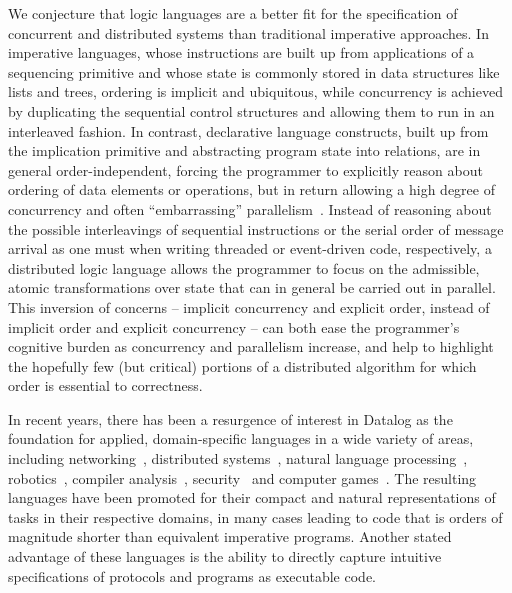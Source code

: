 We conjecture that logic languages are a better fit for the specification of concurrent and distributed systems than traditional imperative approaches.  In imperative languages, whose instructions are built up from applications of a sequencing primitive and whose state is commonly stored in data structures like lists and trees, ordering is implicit and ubiquitous, 
while concurrency is achieved by duplicating the sequential control structures and allowing them
to run in an interleaved fashion.
In contrast, declarative language constructs, built up from the implication primitive and abstracting program state into relations, are in general order-independent, forcing the programmer to explicitly reason about ordering of data elements or operations, but in return allowing a high degree of concurrency and often ``embarrassing'' 
parallelism~\cite{podskey}.  Instead of reasoning about the possible interleavings of sequential
instructions or the serial order of message arrival as one must when writing threaded or 
event-driven code, respectively, a distributed logic language allows the programmer to focus
on the admissible, atomic transformations over state that can in general be carried out in
parallel.  This inversion of concerns -- implicit concurrency and explicit order, instead of
implicit order and explicit concurrency -- can both ease the programmer's cognitive burden as
concurrency and parallelism increase, and help to highlight the hopefully few (but critical) 
portions of a distributed algorithm for which order is essential to correctness. 



In recent years, there has been a resurgence of interest in Datalog as
the foundation for applied, domain-specific languages in a wide
variety of areas, including networking~\cite{Loo2009-CACM},
distributed systems~\cite{Belaramani:2009,Chu:2007}, natural language
processing~\cite{Eisner:2004}, robotics~\cite{Ashley-Rollman:2007},
compiler analysis~\cite{Lam:2005}, security~\cite{sd3,Li:2003,Zhou:2009}
and computer games~\cite{White:2007}.  The resulting languages have
been promoted for their compact and natural representations of tasks
in their respective domains, in many cases leading to code that is
orders of magnitude shorter than equivalent imperative programs.
Another stated advantage of these languages is the ability to
directly capture intuitive specifications of protocols and programs as
executable code.

